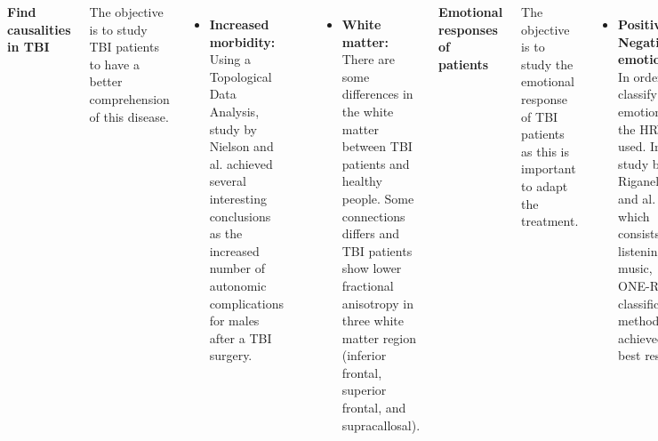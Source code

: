 \documentclass[20pt,margin=1in,innermargin=-4.5in,blockverticalspace=-0.25in]{tikzposter}
\begin{document}
\begin{columns}
{        \textbf{Find causalities in TBI} 
	
    The objective is to study TBI patients to have a better comprehension of this disease.
    \begin{itemize}
            \item \textbf{Increased morbidity:} Using a Topological Data Analysis, study by Nielson and al. \cite{nielson_topological_2015}  achieved several interesting conclusions as the increased number of autonomic complications for males after a TBI surgery.
    \end{itemize}
    \begin{tikzfigure}
        \includegraphics[width=0.6\linewidth]{img/fg1-jbvs.jpg}
        \label{fig:diagram5}
    \end{tikzfigure}
    
    \begin{itemize}
    \item \textbf{White matter:}  There are some differences in the white matter between TBI patients and healthy people. Some connections differs and TBI patients show lower fractional anisotropy in three white matter region (inferior frontal, superior frontal, and supracallosal).
    \end{itemize}
        
    
    \textbf{Emotional responses of patients}
    
    The objective is to study the emotional response of TBI patients as this is important to adapt the treatment.
    \begin{itemize}
            \item \textbf{Positive / Negative emotion:} In order to classify the emotions, the HRV is used. In the study by  F. Riganello and al. \cite{f_riganello_data-mining_2009} which consists in listening music, ONE-R classification method achieved the best results.
        \end{itemize}
        
}
\end{columns}
\end{document}
